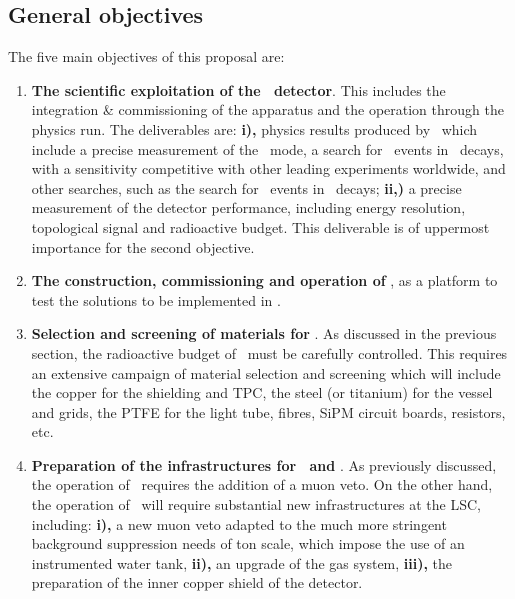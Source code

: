 
\subsection*{General objectives}

The five main objectives of this proposal are:
\begin{enumerate}
\item {\bf The scientific exploitation of the \Next\ detector}. This includes the integration \& commissioning of the apparatus and the operation through the physics run. The deliverables are: {\bf i),} physics results produced by \Next\ which include a precise measurement of the \bbtnu\ mode, a search for \bbonu\ events in \XE\ decays, with a sensitivity competitive with other leading experiments worldwide, and other searches, such as the search for \bbonu\ events in \XEX\ decays; {\bf ii,)} a precise measurement of the detector performance, including energy resolution, topological signal and radioactive budget. This deliverable is of uppermost importance for the second objective. 
\item {\bf The construction, commissioning and operation of \HDEMO}, as a platform to test the solutions to be implemented in \NHD.  
\item {\bf Selection and screening of materials for \NHD}. As discussed in the previous section, the radioactive budget of \NHD\ must be carefully controlled. This requires an extensive campaign of material selection and screening which will include the copper for the shielding and TPC, the steel (or titanium) for the vessel and grids, the PTFE for the light tube, fibres, SiPM circuit boards, resistors, etc. 
\item {\bf Preparation of the infrastructures for \Next\ and \NHD}. As previously discussed, the operation of \Next\ requires the addition of a muon veto. On the other hand, the operation of \NHD\ will require substantial new infrastructures at the LSC, including: {\bf i),} a new muon veto adapted to the much more stringent background suppression needs of ton scale, which impose the use of an instrumented water tank, {\bf ii),} an upgrade of the gas system, {\bf iii),} the preparation of the inner copper shield of the detector. 


\end{enumerate}
